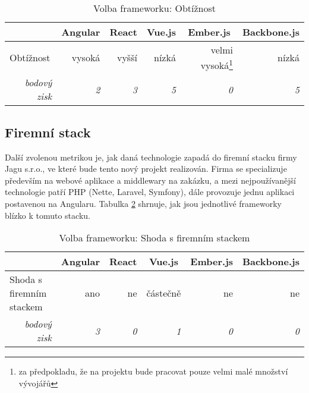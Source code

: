 \begin{table}[h]
\caption{Volba frameworku: Obtížnost}
\label{table:compare:difficulty}
\begin{tabular}{lrrrrr}
\hline
                                         & \multicolumn{1}{c}{Angular} & \multicolumn{1}{c}{React} & \multicolumn{1}{c}{Vue.js} & \multicolumn{1}{c}{Ember.js} & \multicolumn{1}{c}{Backbone.js} \\ \hline
Obtížnost                                & vysoká                      & vyšší                     & nízká                      & velmi vysoká\footnote{za předpokladu, že na projektu bude pracovat pouze velmi malé množství vývojářů}                                                                                                                                  & nízká                           \\
\multicolumn{1}{r}{\textit{bodový zisk}} & \textit{2}                  & \textit{3}                & \textit{5}                 & \textit{0}                   & \textit{5}                  
\end{tabular}
\end{table}


\subsection{Firemní stack}

Další zvolenou metrikou je, jak daná technologie zapadá do firemní stacku firmy Jagu s.r.o., ve které bude tento nový projekt realizován. Firma se specializuje především na webové aplikace a middlewary na zakázku\cite{jaguweb}, a mezi nejpoužívanější technologie patří PHP (Nette, Laravel, Symfony), dále provozuje jednu aplikaci postavenou na Angularu. Tabulka \ref{table:compare:stack} shrnuje, jak jsou jednotlivé frameworky blízko k tomuto stacku.

\begin{table}[h]
\caption{Volba frameworku: Shoda s firemním stackem}
\label{table:compare:stack}
\begin{tabular}{lrrrrr}
\hline
                                         & \multicolumn{1}{c}{Angular} & \multicolumn{1}{c}{React} & \multicolumn{1}{c}{Vue.js} & \multicolumn{1}{c}{Ember.js} & \multicolumn{1}{c}{Backbone.js} \\ \hline
Shoda s firemním stackem                 & ano                         & ne                        & částečně                   & ne                           & ne                              \\
\multicolumn{1}{r}{\textit{bodový zisk}} & \textit{3}                  & \textit{0}                & \textit{1}                 & \textit{0}                   & \textit{0}                  
\end{tabular}
\end{table}

